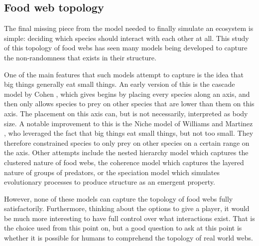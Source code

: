 
\subsection{Food web topology}
\label{sec:topology}
The final missing piece from the model needed to finally simulate an ecosystem is simple: deciding which species should interact with each other at all.
This study of this topology of food webs has seen many models being developed to capture the non-randomness that exists in their structure.

One of the main features that such models attempt to capture is the idea that big things generally eat small things. An early version of this is the cascade model by Cohen \cite{Cohen}, which gives begins by placing every species along an axis, and then only allows species to prey on other species that are lower than them on this axis. The placement on this axis can, but is not necessarily, interpreted as body size.
A notable improvement to this is the Niche model of Williams and Martinez \cite{Williams2000}, who leveraged the fact that big things eat small things, but not too small. They therefore constrained species to only prey on other species on a certain range on the axis.
Other attempts include the nested hierarchy model \cite{TODO} which captures the clustered nature of food webs, the coherence model \cite{Johnson} which captures the layered nature of groups of predators, or the speciation model \cite{Rossberg2006} which simulates evolutionary processes to produce structure as an emergent property.

However, none of these models can capture the topology of food webs fully satisfactorily. Furthermore, thinking about the options to give a player, it would be much more interesting to have full control over what interactions exist. That is the choice used from this point on, but a good question to ask at this point is whether it is possible for humans to comprehend the topology of real world webs.

